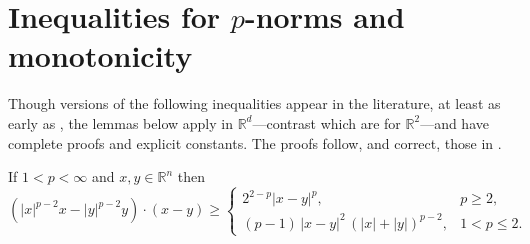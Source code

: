 \documentclass[final,leqno,onefignum,onetabnum]{siamltex1213bueler}
\newcommand\RR{\mathbb{R}}
\begin{document}
\appendix

\section{Inequalities for $p$-norms and monotonicity}   Though versions of the following inequalities appear in the literature, at least as early as \cite{GlowinskiMarroco1975}, the lemmas below apply in $\RR^d$---contrast \cite{BarrettLiu1993,GlowinskiMarroco1975} which are for $\RR^2$---and have complete proofs and explicit constants.  The proofs follow, and correct, those in \cite[Appendix A]{Peral1997}.

\begin{lemma}  If $1<p<\infty$ and $x,y\in\RR^n$ then
\begin{equation}
\left(|x|^{p-2} x - |y|^{p-2} y\right)\cdot(x-y) \ge
   \begin{cases}
       2^{2-p} |x-y|^p, & p\ge 2, \\
       (p-1)\, |x-y|^2 \, \left(|x|+|y|\right)^{p-2}, & 1 < p \le 2.
   \end{cases} \label{eq:pinequality}
\end{equation}
\end{lemma}
\end{document}
